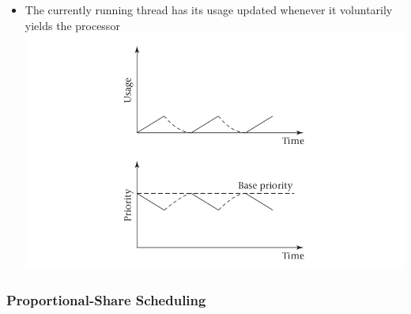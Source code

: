 \documentclass[11pt]{article}
\makeatletter
\def\maxwidth{\ifdim\Gin@nat@width>\linewidth\linewidth
    \else\Gin@nat@width\fi}
\let\Oldincludegraphics\includegraphics
\renewcommand{\includegraphics}[1]{\Oldincludegraphics[width=.8\maxwidth]{#1}}
\providecommand{\tightlist}{%
      \setlength{\itemsep}{0pt}\setlength{\parskip}{0pt}}
\makeatother
\begin{document}
\begin{itemize}
\begin{itemize}
    \begin{itemize}
    \tightlist
    \item
      The currently running thread has its usage updated whenever it
      voluntarily yields the processor\\
      \includegraphics{img/decay_osx.png}
    \end{itemize}
  \end{itemize}
\end{itemize}

    \subsubsection{Proportional-Share
Scheduling}\label{proportional-share-scheduling}
\end{document}
